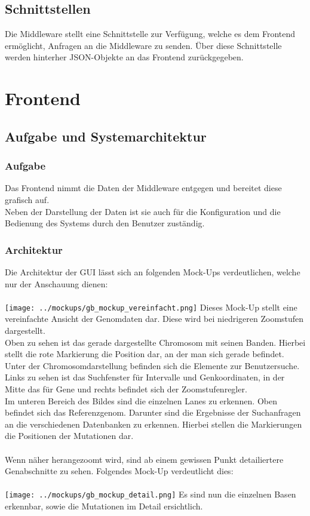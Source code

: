 \documentclass{scrartcl}
\begin{document}
\subsection{Schnittstellen}
Die Middleware stellt eine Schnittstelle zur Verfügung, welche es dem Frontend ermöglicht, Anfragen an die Middleware zu senden. Über diese Schnittstelle werden hinterher JSON-Objekte an das Frontend zurückgegeben.

\newpage
\section{Frontend}
\subsection{Aufgabe und Systemarchitektur}
\subsubsection{Aufgabe}
Das Frontend nimmt die Daten der Middleware entgegen und bereitet diese grafisch auf.\\
Neben der Darstellung der Daten ist sie auch für die Konfiguration und die Bedienung des Systems durch den Benutzer zuständig.
\subsubsection{Architektur}
Die Architektur der GUI lässt sich an folgenden Mock-Ups verdeutlichen, welche nur der Anschauung dienen:\\\\
\texttt{[image: ../mockups/gb\_mockup\_vereinfacht.png]}
Dieses Mock-Up stellt eine vereinfachte Ansicht der Genomdaten dar. Diese wird bei niedrigeren Zoomstufen dargestellt. \\ Oben zu sehen ist das gerade dargestellte Chromosom mit seinen Banden. Hierbei stellt die rote Markierung die Position dar, an der man sich gerade befindet.\\
Unter der Chromosomdarstellung befinden sich die Elemente zur Benutzersuche. Links zu sehen ist das Suchfenster für Intervalle und Genkoordinaten, in der Mitte das für Gene und rechts befindet sich der Zoomstufenregler.\\
Im unteren Bereich des Bildes sind die einzelnen Lanes zu erkennen. Oben befindet sich das Referenzgenom. Darunter sind die Ergebnisse der Suchanfragen an die verschiedenen Datenbanken zu erkennen. Hierbei stellen die Markierungen die Positionen der Mutationen dar.\\\\
Wenn näher herangezoomt wird, sind ab einem gewissen Punkt detailiertere Genabschnitte zu sehen. Folgendes Mock-Up verdeutlicht dies:\\\\
\texttt{[image: ../mockups/gb\_mockup\_detail.png]}
Es sind nun die einzelnen Basen erkennbar, sowie die Mutationen im Detail ersichtlich.
\end{document}
